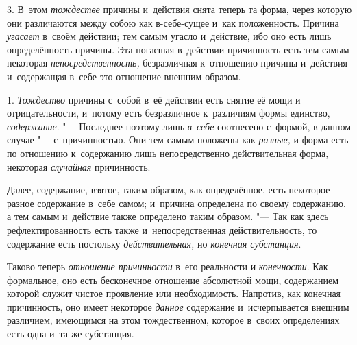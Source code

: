 3. В~этом {\em тождестве} причины и~действия снята теперь та форма, через
которую они различаются между собою как в-себе-сущее и~как положенность.
Причина {\em угасает} в~своём действии; тем самым угасло и~действие, ибо оно
есть лишь определённость причины. Эта погасшая в~действии причинность есть тем
самым некоторая {\em непосредственность,} безразличная к~отношению причины
и~действия и~содержащая в~себе это отношение внешним образом.


1. {\em Тождество} причины с~собой в~её действии есть снятие её мощи и
отрицательности, и~потому есть безразличное к~различиям формы единство,
{\em содержание}. "--- Последнее поэтому лишь {\em в~себе} соотнесено с~формой,
в данном случае "--- с~причинностью. Они тем самым положены как {\em разные,} и
форма есть по отношению к~содержанию лишь непосредственно действительная форма,
некоторая {\em случайная} причинность.

Далее, содержание, взятое, таким образом, как определённое, есть некоторое
разное содержание в~себе самом; и~причина определена по своему содержанию,
а тем самым и~действие также определено таким образом. "--- Так как здесь
рефлектированность есть также и~непосредственная действительность, то
содержание есть постольку {\em действительная,} но {\em конечная субстанция}.

Таково теперь {\em отношение причинности} в~его реальности и {\em конечности}.
Как формальное, оно есть бесконечное отношение абсолютной мощи, содержанием
которой служит чистое проявление или необходимость. Напротив, как конечная
причинность, оно имеет некоторое {\em данное} содержание и~исчерпывается
внешним различием, имеющимся на этом тождественном, которое в~своих
определениях есть одна и~та же субстанция.

